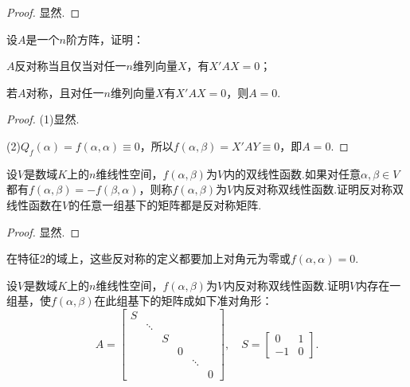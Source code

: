 \begin{proof}
	显然.
\end{proof}
\begin{prob}[14]
	设$A$是一个$n$阶方阵，证明：
	\begin{mylist}
		\item $A$反对称当且仅当对任一$n$维列向量$X$，有$X'AX=0$；
		\item 若$A$对称，且对任一$n$维列向量$X$有$X'AX=0$，则$A=0$.
	\end{mylist}
\end{prob}
\begin{proof}
	(1)显然.

	(2)$Q_f(\alpha)=f(\alpha,\alpha)\equiv0$，所以$f(\alpha,\beta)=X'AY\equiv0$，即$A=0$.
\end{proof}
\begin{prob}[16]
	设$V$是数域$K$上的$n$维线性空间，$f(\alpha,\beta)$为$V$内的双线性函数.如果对任意$\alpha,\beta\in V$都有$f(\alpha,\beta)=-f(\beta,\alpha)$，则称$f(\alpha,\beta)$为$V$内{\heiti 反对称双线性函数}.证明反对称双线性函数在$V$的任意一组基下的矩阵都是反对称矩阵.
\end{prob}
\begin{proof}
	显然.
\end{proof}
\begin{note}
	在特征2的域上，这些反对称的定义都要加上对角元为零或$f(\alpha,\alpha)=0$.
\end{note}
\begin{prob}[17]
	设$V$是数域$K$上的$n$维线性空间，$f(\alpha,\beta)$为$V$内反对称双线性函数.证明$V$内存在一组基，使$f(\alpha,\beta)$在此组基下的矩阵成如下准对角形：
	\[
		A=\begin{bmatrix}
			S &        &   &   &        &   \\
			  & \ddots &   &   &        &   \\
			  &        & S &   &        &   \\
			  &        &   & 0 &        &   \\
			  &        &   &   & \ddots &   \\
			  &        &   &   &        & 0
		\end{bmatrix},\quad S=\begin{bmatrix}
			0  & 1 \\
			-1 & 0
		\end{bmatrix}.
	\]
\end{prob}
